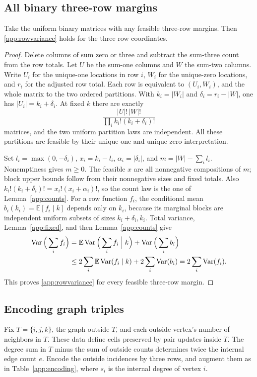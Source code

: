 \subsection{All binary three-row margins}
\begin{lemma}\label{app:rows}
Take the uniform binary matrices with any feasible three-row margins. Then
\eqref{app:rowvariance} holds for the three row coordinates.
\end{lemma}
\begin{proof}
Delete columns of sum zero or three and subtract the sum-three count from
the row totals. Let $U$ be the sum-one columns and $W$ the sum-two columns.
Write $U_i$ for the unique-one locations in row $i$, $W_i$ for the
unique-zero locations, and $r_i$ for the adjusted row total. Each row is
equivalent to $(U_i,W_i)$, and the whole matrix to the two ordered
partitions. With $k_i=|W_i|$ and $\delta_i=r_i-|W|$, one has
$|U_i|=k_i+\delta_i$. At fixed $k$ there are exactly
\[
 \frac{|U|!\,|W|!}{\prod_i k_i!(k_i+\delta_i)!}
\]
matrices, and the two uniform partition laws are independent. All these
partitions are feasible by their unique-one and unique-zero interpretation.

Set $l_i=\max(0,-\delta_i)$, $x_i=k_i-l_i$, $\alpha_i=|\delta_i|$, and
$m=|W|-\sum_i l_i$. Nonemptiness gives $m\ge0$. The feasible $x$ are all
nonnegative compositions of $m$; block upper bounds follow from their
nonnegative sizes and fixed totals. Also
$k_i!(k_i+\delta_i)!=x_i!(x_i+\alpha_i)!$, so the count law is the one of
Lemma~\ref{app:counts}. For a row function $f_i$, the conditional mean
$b_i(k_i)=\mathbb E[f_i\mid k]$ depends only on $k_i$, because its marginal
blocks are independent uniform subsets of sizes $k_i+\delta_i,k_i$.
Total variance, Lemma~\ref{app:fixed}, and then Lemma~\ref{app:counts} give
\begin{align*}
 \operatorname{Var}\Big(\sum_i f_i\Big)
 &=\mathbb E\operatorname{Var}\Big(\sum_i f_i\Bigm| k\Big)
  +\operatorname{Var}\Big(\sum_i b_i\Big)\\
 &\le2\sum_i\mathbb E\operatorname{Var}(f_i\mid k)+2\sum_i\operatorname{Var}(b_i)
 =2\sum_i\operatorname{Var}(f_i).
\end{align*}
This proves \eqref{app:rowvariance} for every feasible three-row margin.
\end{proof}

\subsection{Encoding graph triples}
Fix $T=\{i,j,k\}$, the graph outside $T$, and each outside vertex's number of
neighbors in $T$. These data define cells preserved by pair updates inside
$T$. The degree sum in $T$ minus the sum of outside counts determines twice
the internal edge count $e$. Encode the outside incidences by three rows,
and augment them as in Table~\ref{app:encoding}, where $s_i$ is the internal
degree of vertex $i$.

